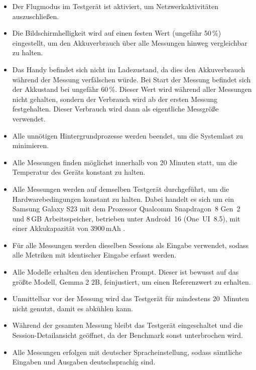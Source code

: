 \begin{itemize}
\item Der Flugmodus im Testgerät ist aktiviert, um Netzwerkaktivitäten auszuschließen.
\item Die Bildschirmhelligkeit wird auf einen festen Wert (ungefähr 50\,\%) eingestellt, um den Akkuverbrauch über alle Messungen hinweg vergleichbar zu halten.
\item Das Handy befindet sich nicht im Ladezustand, da dies den Akkuverbrauch während der Messung verfälschen würde. Bei Start der Messung befindet sich der Akkustand bei ungefähr 60\,\%. Dieser Wert wird während aller Messungen nicht gehalten, sondern der Verbrauch wird ab der ersten Messung festgehalten. Dieser Verbrauch wird dann als eigentliche Messgröße verwendet.
\item Alle unnötigen Hintergrundprozesse werden beendet, um die Systemlast zu minimieren.
\item Alle Messungen finden möglichst innerhalb von 20 Minuten statt, um die Temperatur des Geräts konstant zu halten.
\item Alle Messungen werden auf demselben Testgerät durchgeführt, um die Hardwarebedingungen konstant zu halten. Dabei handelt es sich um ein Samsung Galaxy S23 mit dem Prozessor Qualcomm Snapdragon~8 Gen~2 und 8\,GB Arbeitsspeicher, betrieben unter Android~16 (One~UI~8.5), mit einer Akkukapazität von 3900\,mAh \autocite{samsung_s23_specs, s23_oneui85_android16}.
\item Für alle Messungen werden dieselben Sessions als Eingabe verwendet, sodass alle Metriken mit identischer Eingabe erfasst werden.
\item Alle Modelle erhalten den identischen Prompt. Dieser ist bewusst auf das größte Modell, Gemma 2 2B, feinjustiert, um einen Referenzwert zu erhalten.
\item Unmittelbar vor der Messung wird das Testgerät für mindestens 20~Minuten nicht genutzt, damit es abkühlen kann.
\item Während der gesamten Messung bleibt das Testgerät eingeschaltet und die Session-Detailansicht geöffnet, da der Benchmark sonst unterbrochen wird.
\item Alle Messungen erfolgen mit deutscher Spracheinstellung, sodass sämtliche Eingaben und Ausgaben deutschsprachig sind.
\end{itemize}

